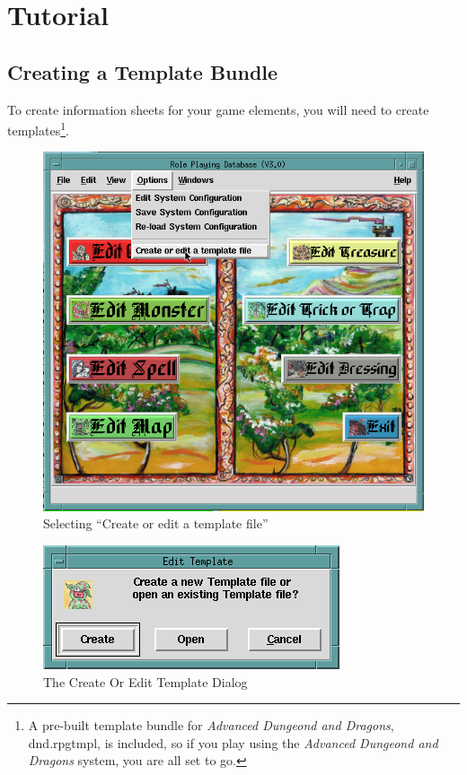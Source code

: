 \chapter{Tutorial}
\label{Tutorial}

\section{Creating a Template Bundle}

To create information sheets for your game elements, you will need to
create templates\footnote{A pre-built template bundle for
\textit{Advanced Dungeond and Dragons}, dnd.rpgtmpl, is included, so if
you play using the \textit{Advanced Dungeond and Dragons} system, you
are all set to go.}.

\begin{figure}[hbpt] 
\begin{centering}
\includegraphics[width=5in]{OptionMenu.png} 
\caption{Selecting ``Create or edit a template file''} 
\label{fig:createoredittemplatemenu} 
\end{centering}
\end{figure} 
\begin{figure}[hbpt] 
\begin{centering}
\includegraphics{CreateOrEditTemplateDialog.png} 
\caption{The Create Or Edit Template Dialog}
\label{fig:createoredittemplate} 
\end{centering}
\end{figure} 
